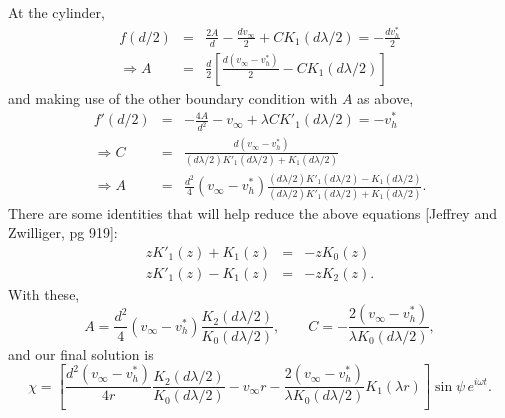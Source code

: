 \documentclass[11pt]{amsart}
\newcommand{\vinf}{v_{\infty}}
\newcommand{\om}{\omega}
\newcommand{\bee}[1]{\begin{equation} #1 \end{equation}}
\newcommand{\bees}[1]{\begin{equation*} #1 \end{equation*}}
\newcommand{\baas}[1]{\begin{eqnarray*} #1 \end{eqnarray*}}
\begin{document}
At the cylinder,
\baas{
f(d/2) &=& \frac{2A}{d} - \frac{d\vinf}{2} + CK_1(d\lambda/2) = -\frac{d v_h^*}{2} \\
\Rightarrow A &=& \frac{d}{2}\left[ \frac{d(\vinf-v_h^*)}{2} - C K_1(d\lambda/2)\right]
}
and making use of the other boundary condition with $A$ as above,
\baas{
f'(d/2) &=& -\frac{4A}{d^2} - \vinf + \lambda C K'_1(d\lambda/2) = -v_h^* \\
\Rightarrow C &=& \frac{d(\vinf-v_h^*)}{(d\lambda/2)K'_1(d\lambda/2) + K_1(d\lambda/2)} \\
\Rightarrow A &=& \frac{d^2}{4}(\vinf-v_h^*)\frac{(d\lambda/2)K'_1(d\lambda/2) - K_1(d\lambda/2)}{(d\lambda/2)K'_1(d\lambda/2) + K_1(d\lambda/2)}.
}
There are some identities that will help reduce the above equations [Jeffrey and Zwilliger, pg 919]:
\baas{
zK'_1(z) + K_1(z) &=& -zK_0(z) \\
zK'_1(z) - K_1(z) &=& -zK_2(z).
}
With these,
\bees{
A = \frac{d^2}{4}(\vinf-v_h^*)\frac{K_2(d\lambda/2)}{K_0(d\lambda/2)}, \qquad C = -\frac{2(\vinf-v_h^*)}{\lambda K_0(d\lambda/2)},
}
and our final solution is 
\bee{
\chi = \left[ \frac{d^2(\vinf-v_h^*)}{4r}\frac{K_2(d\lambda/2)}{K_0(d\lambda/2)} - \vinf r - \frac{2(\vinf-v_h^*)}{\lambda K_0(d\lambda/2)}K_1(\lambda r)\right]\sin\psi\,e^{i\om t}. \label{eqn:chisoln}
}
\end{document}
